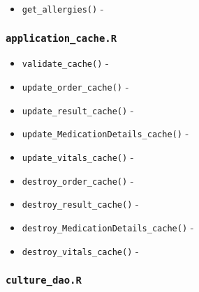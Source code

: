 \documentclass[
]{book}
\providecommand{\tightlist}{%
  \setlength{\itemsep}{0pt}\setlength{\parskip}{0pt}}
\begin{document}
\begin{itemize}
\tightlist
\item
  \texttt{get\_allergies()} -
\end{itemize}

\hypertarget{application_cache.r}{%
\subsubsection{\texorpdfstring{\texttt{application\_cache.R}}{application\_cache.R}}\label{application_cache.r}}

\begin{itemize}
\tightlist
\item
  \texttt{validate\_cache()} -
\item
  \texttt{update\_order\_cache()} -
\item
  \texttt{update\_result\_cache()} -
\item
  \texttt{update\_MedicationDetails\_cache()} -
\item
  \texttt{update\_vitals\_cache()} -
\item
  \texttt{destroy\_order\_cache()} -
\item
  \texttt{destroy\_result\_cache()} -
\item
  \texttt{destroy\_MedicationDetails\_cache()} -
\item
  \texttt{destroy\_vitals\_cache()} -
\end{itemize}

\hypertarget{culture_dao.r}{%
\subsubsection{\texorpdfstring{\texttt{culture\_dao.R}}{culture\_dao.R}}\label{culture_dao.r}}
\end{document}
